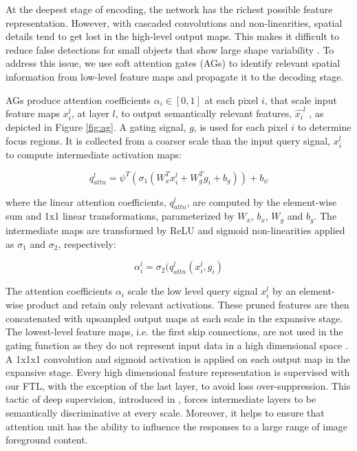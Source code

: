 \documentclass{article}
\begin{document}
At the deepest stage of encoding, the network has the richest possible feature representation. However, with cascaded convolutions and non-linearities, spatial details tend to get lost in the high-level output maps. This makes it difficult to reduce false detections for small objects that show large shape variability \cite{oktay}. To address this issue, we use soft attention gates (AGs) to identify relevant spatial information from low-level feature maps and propagate it to the decoding stage.

AGs produce attention coefficients $\alpha_i \in [0,1]$ at each pixel $i$, that scale input feature maps $x^l_i$, at layer $l$, to output semantically relevant features, $\hat{x_i}^l$ , as depicted in Figure \ref{fig:ag}. A gating signal, $g$, is used for each pixel $i$ to determine focus regions. It is collected from a coarser scale than the input query signal, $x^l_i$ to compute intermediate activation maps: 
 
\begin{equation}
q^l_{attn} = \psi^T ( \sigma_1 ( W_x^T x_i^l + W_g^T g_i + b_g)) + b_{\psi}
\label{eq:qattn}
\end{equation}

where the linear attention coefficients, $q^l_{attn}$, are computed by the element-wise sum and 1x1 linear transformations, parameterized by $W_x$, $b_x$, $W_g$ and $b_g$.  The intermediate maps are transformed by ReLU and sigmoid non-linearities applied as $\sigma_1$ and $\sigma_2$, respectively:  

\begin{equation}
\alpha_i^l = \sigma_2 ( q^l_{attn}(x_i^l, g_i) 
\label{eq:alpha}
\end{equation} 

The attention coefficients $\alpha_i$ scale the low level query signal $x^l_i$ by an element-wise product and retain only relevant activations. These pruned features are then concatenated with upsampled output maps at each scale in the expansive stage. The lowest-level feature maps, i.e. the first skip connections, are not used in the gating function as they do not represent input data in a high dimensional space \cite{oktay}. A 1x1x1 convolution and sigmoid activation is applied on each output map in the expansive stage. Every high dimensional feature representation is supervised with our FTL, with the exception of the last layer, to avoid loss over-suppression. This tactic of deep supervision, introduced in \cite{lee}, forces intermediate layers to be semantically discriminative at every scale. Moreover, it helps to ensure that attention unit has the ability to influence the responses to a large range of image foreground content. 
\end{document}
